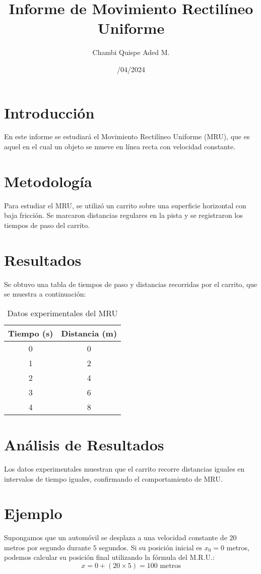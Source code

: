 \documentclass{article}
\title{Informe de Movimiento Rectilíneo Uniforme}
\author{Chambi Quispe Aded M.}
\date{\25/04/2024}
\begin{document}
\maketitle

\section{Introducción}
En este informe se estudiará el Movimiento Rectilíneo Uniforme (MRU), que es aquel en el cual un objeto se mueve en línea recta con velocidad constante.

\section{Metodología}
Para estudiar el MRU, se utilizó un carrito sobre una superficie horizontal con baja fricción. Se marcaron distancias regulares en la pista y se registraron los tiempos de paso del carrito.

\section{Resultados}
Se obtuvo una tabla de tiempos de paso y distancias recorridas por el carrito, que se muestra a continuación:

\begin{table}[h]
\centering
\begin{tabular}{|c|c|}
\hline
Tiempo (s) & Distancia (m) \\ \hline
0          & 0             \\ \hline
1          & 2             \\ \hline
2          & 4             \\ \hline
3          & 6             \\ \hline
4          & 8             \\ \hline
\end{tabular}
\caption{Datos experimentales del MRU}
\end{table}

\section{Análisis de Resultados}
Los datos experimentales muestran que el carrito recorre distancias iguales en intervalos de tiempo iguales, confirmando el comportamiento de MRU.

\section{Ejemplo}
Supongamos que un automóvil se desplaza a una velocidad constante de $20$ metros por segundo durante $5$ segundos. Si su posición inicial es $x_0 = 0$ metros, podemos calcular su posición final utilizando la fórmula del M.R.U.:
\[ x = 0 + (20 \times 5) = 100 \text{ metros} \]
\end{document}
